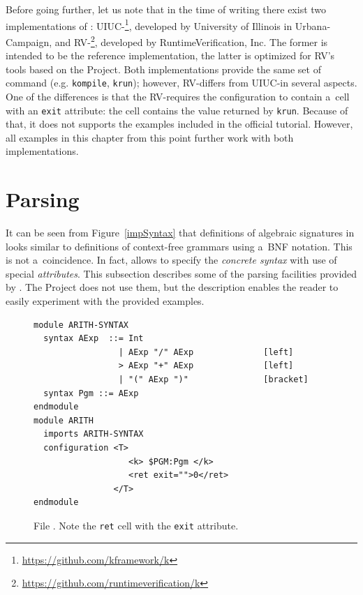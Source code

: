 \documentclass[nolot,nolof,nocover,printed]{fithesis3}
\newcommand{\krun}{\texttt{krun}\xspace}
\newcommand{\kompile}{\texttt{kompile}\xspace}
\newcommand{\Project}{Project\xspace}
\begin{document}
Before going further, let us note that in the time of writing there exist two implementations of \K: UIUC-\K\footnote{\url{https://github.com/kframework/k}}, developed by University of Illinois in Urbana-Campaign, and RV-\K\footnote{\url{https://github.com/runtimeverification/k}}, developed by RuntimeVerification, Inc. The former is intended to be the reference implementation, the latter is optimized for RV's tools based on the Project. Both implementations provide the same set of command (e.g. \kompile, \krun); however, RV-\K differs from UIUC-\K in several aspects. One of the differences is that the RV-\K requires the configuration to contain a~cell with an \lstinline|exit| attribute: the cell contains the value returned by \krun. Because of that, it does not supports the examples included in the official \K tutorial. However, all examples in this chapter from this point further work with both implementations.

\section{Parsing}
It can be seen from Figure~\ref{impSyntax} that definitions of algebraic signatures in \K looks similar to definitions of context-free grammars using a~BNF notation. This is not a~coincidence. In fact, \K allows to specify the \textit{concrete syntax} with use of special \textit{attributes}. This subsection describes some of the parsing facilities provided by \K. The \Project does not use them, but the description enables the reader to easily experiment with the provided examples.

\begin{figure}
\begin{lstlisting}
module ARITH-SYNTAX
  syntax AExp  ::= Int
                 | AExp "/" AExp              [left]
                 > AExp "+" AExp              [left]
                 | "(" AExp ")"               [bracket]
  syntax Pgm ::= AExp
endmodule
module ARITH
  imports ARITH-SYNTAX  
  configuration <T>
                   <k> $PGM:Pgm </k>
                   <ret exit="">0</ret>
                </T>
endmodule
\end{lstlisting}
\caption{File \protect{}. Note the \lstinline|ret| cell with the \lstinline|exit| attribute.}
\label{arithSource}
\end{figure}
\end{document}
